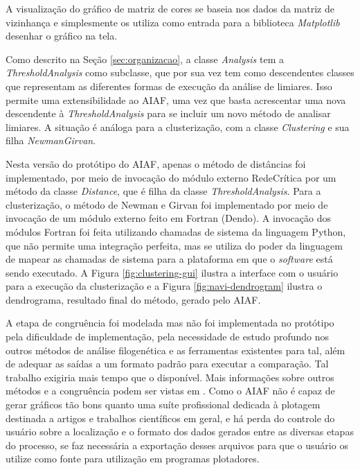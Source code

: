 A visualização do gráfico de matriz de cores se baseia nos dados da matriz de vizinhança e simplesmente os utiliza como entrada para a biblioteca
\textit{Matplotlib} desenhar o gráfico na tela.

Como descrito na Seção \ref{sec:organizacao}, a classe \textit{Analysis} tem a \textit{ThresholdAnalysis} como subclasse,
que por sua vez tem como descendentes classes que representam as diferentes formas de execução da análise de limiares. Isso permite uma extensibilidade
ao AIAF, uma vez que basta acrescentar uma nova descendente à \textit{ThresholdAnalysis} para se incluir um novo método de analisar limiares. A situação
é análoga para a clusterização, com a classe \textit{Clustering} e sua filha \textit{NewmanGirvan}.

Nesta versão do protótipo do AIAF, apenas o método de distâncias foi implementado, por meio de invocação do módulo externo RedeCrítica por um método da
classe \textit{Distance}, que é filha da classe \textit{ThresholdAnalysis}. Para a clusterização, o método de Newman e Girvan foi implementado por meio
de invocação de um módulo externo feito em Fortran (Dendo). A invocação dos módulos Fortran foi feita utilizando chamadas de sistema da linguagem Python,
que não permite uma integração perfeita, mas se utiliza do poder da linguagem de mapear as chamadas de sistema para a plataforma em que o \textit{software}
está sendo executado. A Figura \ref{fig:clustering-gui} ilustra a interface com o usuário para a execução da clusterização e a Figura \ref{fig:navi-dendrogram}
ilustra o dendrograma, resultado final do método, gerado pelo AIAF.

A etapa de congruência foi modelada mas não foi implementada no protótipo pela dificuldade de implementação, pela necessidade de estudo profundo nos outros
métodos de análise filogenética e as ferramentas existentes para tal, além de adequar as saídas a um formato padrão para executar a comparação. Tal trabalho
exigiria mais tempo que o disponível. Mais informações sobre outros métodos e a congruência podem
ser vistas em \cite{marcelo2010}. Como o AIAF não é capaz de gerar gráficos tão bons quanto uma suíte profissional dedicada à plotagem destinada a artigos e
trabalhos científicos em geral, e há perda do controle do usuário sobre a localização e o formato dos dados gerados entre as diversas etapas do processo, se
faz necessária a exportação desses arquivos para que o usuário os utilize como fonte para utilização em programas plotadores.

